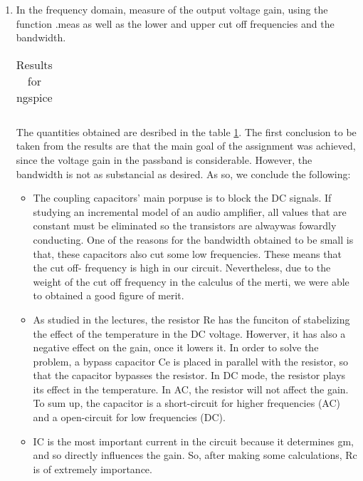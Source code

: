 \begin{enumerate}
\item  In the frequency domain, measure of the output voltage gain, using the function .meas as well as the lower and upper cut off frequencies and the bandwidth.


\begin{table}[ht]
  \centering
  \begin{tabular}{|l|r|}
    \hline    
   
    \end{tabular}
  \caption{Results for ngspice}
    \label{tab:results}
\end{table}


The quantities obtained are desribed in the table \ref{tab:results}. The first conclusion to be taken from the results are that the main goal of the assignment was achieved, since the voltage gain  in the passband is considerable. However, the bandwidth is not as substancial as desired. As so, we conclude the following:

\begin{itemize}

\item The coupling capacitors' main porpuse is to block the DC signals. If studying an incremental model of an audio amplifier, all values that are constant must be eliminated so the transistors are alwaywas fowardly conducting. One of the reasons for the bandwidth obtained to be small is that, these capacitors also cut some low frequencies. These means that the cut off- frequency is high in our circuit. Nevertheless, due to the weight of the cut off frequency in the calculus of the merti, we were able to obtained a good figure of merit.

\item  As studied in the lectures, the resistor Re has the funciton of stabelizing the effect of the temperature in the DC voltage. Howerver, it has also a negative effect on the gain, once it lowers it. In order to solve the problem, a bypass capacitor Ce is placed in parallel with the resistor, so that the capacitor bypasses the resistor. In DC mode, the resistor plays its effect in the temperature. In AC, the resistor will not affect the gain. To sum up, the capacitor is a short-circuit for higher frequencies (AC) and a open-circuit for low frequencies (DC).

\item IC is the most important current in the circuit because it determines gm, and so directly influences the gain. So, after making some calculations, Rc is of extremely importance.



\end{itemize}
\end{enumerate}
